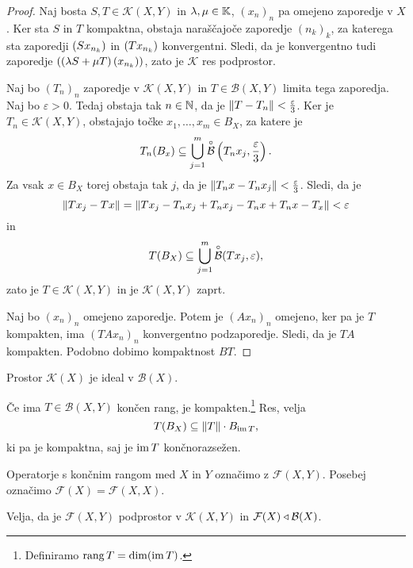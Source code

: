 \begin{proof}
Naj bosta $S, T \in \mathcal{K}(X,Y)$ in $\lambda, \mu \in \mathbb{K}$,
$(x_n)_n$ pa omejeno zaporedje v $X$. Ker sta $S$ in $T$ kompaktna,
obstaja naraščajoče zaporedje $(n_k)_k$, za katerega sta zaporedji
$\left(Sx_{n_k}\right)$ in $\left(Tx_{n_k}\right)$ konvergentni. Sledi, da je
konvergentno tudi zaporedje $\left((\lambda S + \mu T)\left(x_{n_k}\right)\right)$,
zato je $\mathcal{K}$ res podprostor.

Naj bo $(T_n)_n$ zaporedje v $\mathcal{K}(X,Y)$ in
$T \in \mathcal{B}(X,Y)$ limita tega zaporedja. Naj bo
$\varepsilon > 0$. Tedaj obstaja tak $n \in \mathbb{N}$, da je
$\left\lVert T - T_n\right\rVert < \frac{\varepsilon}{3}$. Ker je
$T_n \in \mathcal{K}(X,Y)$, obstajajo točke
$x_1, \dots, x_m \in B_X$, za katere je
\[
T_n(B_x) \subseteq
\bigcup_{j=1}^m \overset{\circ}{\mathcal{B}} \left(T_nx_j, \frac{\varepsilon}{3}\right).
\]
Za vsak $x \in B_X$ torej obstaja tak $j$, da je
$\left\lVert T_nx - T_n x_j\right\rVert < \frac{\varepsilon}{3}$. Sledi, da je
\[
\left\lVert Tx_j - Tx\right\rVert =
\left\lVert Tx_j - T_nx_j + T_nx_j - T_nx + T_nx - T_x\right\rVert <
\varepsilon
\]
in
\[
T(B_X) \subseteq \bigcup_{j=1}^m \overset{\circ}{\mathcal{B}}(Tx_j, \varepsilon),
\]
zato je $T \in \mathcal{K}(X,Y)$ in je $\mathcal{K}(X,Y)$ zaprt.

Naj bo $(x_n)_n$ omejeno zaporedje. Potem je $(Ax_n)_n$ omejeno,
ker pa je $T$ kompakten, ima $(TAx_n)_n$ konvergentno podzaporedje.
Sledi, da je $TA$ kompakten. Podobno dobimo kompaktnost $BT$.
\end{proof}

\begin{posledica}
Prostor $\mathcal{K}(X)$ je ideal v $\mathcal{B}(X)$.
\end{posledica}

\begin{zgled}
Če ima $T \in \mathcal{B}(X,Y)$ končen rang, je
kompakten.\footnote{Definiramo $\operatorname{rang} T = \dim(\operatorname{im} T)$.} Res, velja
\[
T(B_X) \subseteq \left\lVert T\right\rVert \cdot B_{\operatorname{im} T},
\]
ki pa je kompaktna, saj je $\operatorname{im} T$ končnorazsežen.
\end{zgled}

\begin{opomba}
Operatorje s končnim rangom med $X$ in $Y$ označimo z
$\mathcal{F}(X,Y)$. Posebej označimo
$\mathcal{F}(X) = \mathcal{F}(X,X)$.
\end{opomba}

\begin{opomba}
Velja, da je $\mathcal{F}(X,Y)$ podprostor v $\mathcal{K}(X,Y)$ in
$\mathcal{F}(X) \triangleleft \mathcal{B}(X)$.
\end{opomba}


